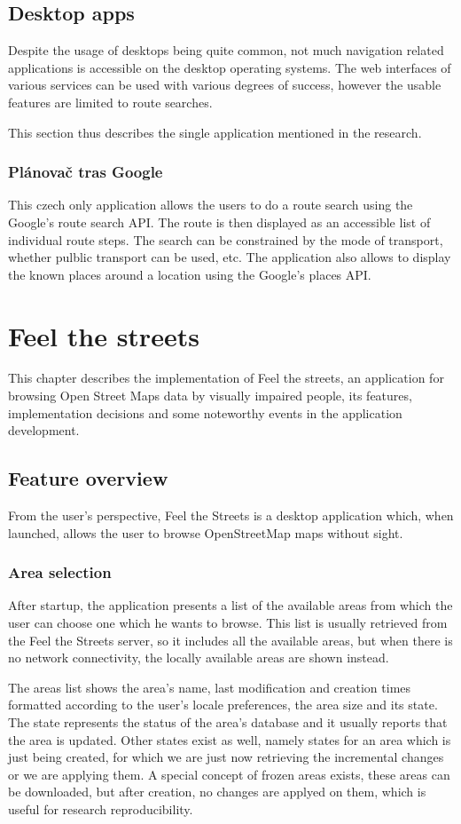 \documentclass[nolof,digital]{fithesis3}
\begin{document}
\section{Desktop apps}
Despite the usage of desktops being quite common, not much navigation related applications is accessible on the desktop operating systems. The web interfaces of various services can be used with various degrees of success, however the usable features are limited to route searches.

This section thus describes the single application mentioned in the research.
\subsection{Plánovač tras Google}
This czech only application \parencite{ptg} allows the users to do a route search using the Google's route search API. The route is then displayed as an accessible list of individual route steps. The search can be constrained by the mode of transport, whether pulblic transport can be used, etc. The application also allows to display the known places around a location using the Google's places API.
\chapter{Feel the streets}
This chapter describes the implementation of Feel the streets, an application for browsing Open Street Maps data by visually impaired people, its features, implementation decisions and some noteworthy events in the application development.
\section{Feature overview}
From the user's perspective, Feel the Streets is a desktop application which, when launched, allows the user to browse OpenStreetMap maps without sight.
\subsection{Area selection}
After startup, the application presents a list of the available areas from which the user can choose one which he wants to browse. This list is usually retrieved from the Feel the Streets server, so it includes all the available areas, but when there is no network connectivity, the locally available areas are shown instead.

The areas list shows the area's name, last modification and creation times formatted according to the user's locale preferences, the area size and its state. The state represents the status of the area's database and it usually reports that the area is updated. Other states exist as well, namely states for an area which is just being created, for which we are just now retrieving the incremental changes or we are applying them. A special concept of frozen areas exists, these areas can be downloaded, but after creation, no changes are applyed on them, which is useful for research reproducibility.
\end{document}
